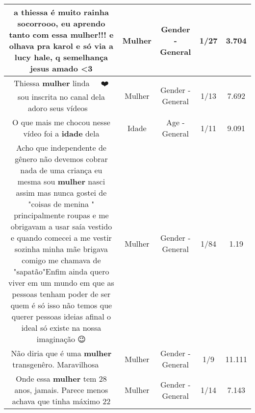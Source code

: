 \documentclass[11pt]{article}
\newlength\mylength
\begin{document}
\begin{center}
\begin{longtable}{|C{.65\mylength}|C{.30\mylength}|C{.12\mylength}|C{.12\mylength}|C{.12\mylength}|}
  \small a thiessa é muito rainha socorrooo, eu aprendo tanto com essa \textbf{mulher}!!! e olhava pra karol e só via a lucy hale, q semelhança jesus amado <3\normalsize   & Mulher & Gender - General & 1/27 & 3.704 \\  \hline
  \small Thiessa \textbf{mulher} linda 🥰🥰😍😍❤️ sou inscrita no canal dela adoro seus vídeos 🥰🥰\normalsize   & Mulher & Gender - General & 1/13 & 7.692 \\  \hline
  \small O que mais me chocou nesse vídeo foi a \textbf{idade} dela\normalsize   & Idade & Age - General & 1/11 & 9.091 \\  \hline
  \small Acho que independente de gênero não devemos cobrar nada de uma criança eu mesma sou \textbf{mulher} nasci assim mas nunca gostei de "coisas de menina " principalmente roupas e me obrigavam a usar saía vestido e quando comecei a me vestir sozinha minha mãe brigava comigo me chamava de "sapatão"Enfim ainda quero viver em um mundo em que as pessoas tenham poder de ser quem é só isso não temos que querer pessoas ideias afinal o ideal só existe na nossa imaginação  😉\normalsize   & Mulher & Gender - General & 1/84 & 1.19 \\  \hline
  \small Não diria que é uma \textbf{mulher} transgenêro. Maravilhosa 👏👏👏👏\normalsize   & Mulher & Gender - General & 1/9 & 11.111 \\  \hline
  \small Onde essa \textbf{mulher} tem 28 anos, jamais. Parece menos achava que tinha máximo 22\normalsize   & Mulher & Gender - General & 1/14 & 7.143 \\  \hline

\end{longtable}
\end{center}
\end{document}
